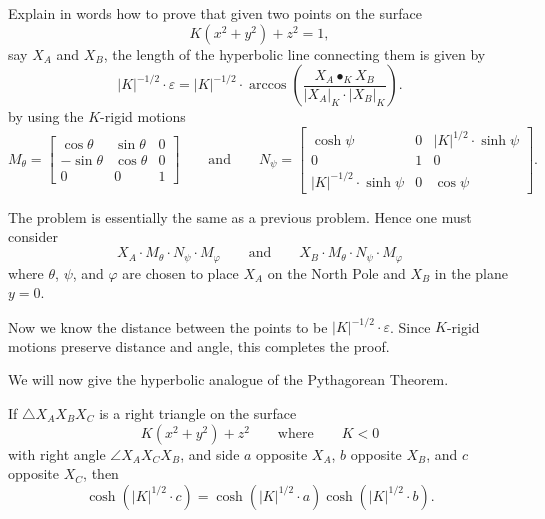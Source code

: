 \documentclass{ximera}
\begin{document}
\begin{problem}
  Explain in words how to prove that given two points on the surface
  \[
  K(x^2 + y^2) + z^2 =1,
  \]
  say $X_A$ and $X_B$, the length of the hyperbolic line connecting them
  is given by
  \[
  |K|^{-1/2}\cdot \varepsilon = |K|^{-1/2} \cdot \arccos\left(\frac{X_A\bullet_K X_B}{|X_A|_K\cdot |X_B|_K}\right).
  \]
  by using the $K$-rigid motions
  \[
   M_\theta=
  \begin{bmatrix}
    \cos\theta & \sin\theta & 0\\
    -\sin\theta & \cos\theta & 0\\
    0 & 0 & 1
  \end{bmatrix}
  \qquad\text{and}\qquad
 N_\psi=
  \begin{bmatrix}
    \cosh\psi & 0 & |K|^{1/2}\cdot\sinh\psi\\
    0 & 1 & 0\\
    |K|^{-1/2}\cdot\sinh\psi & 0 & \cos\psi
  \end{bmatrix}.
  \]
  \begin{freeResponse}
    The problem is essentially the same as a previous problem. Hence one must consider
    \[
    X_A\cdot M_\theta\cdot N_\psi\cdot M_\varphi \qquad\text{and}\qquad
    X_B\cdot M_\theta\cdot N_\psi\cdot M_\varphi
    \]
    where $\theta$, $\psi$, and $\varphi$ are chosen to place $X_A$ on
    the North Pole and $X_B$ in the plane $y=0$.

    Now we know the distance between the points to be
    $|K|^{-1/2}\cdot\varepsilon$. Since $K$-rigid motions preserve
    distance and angle, this completes the proof.
  \end{freeResponse}
\end{problem}


We will now give the hyperbolic analogue of the Pythagorean Theorem.

\begin{theorem}
  If $\triangle X_AX_BX_C$ is a right triangle on the surface
  \[
  K(x^2+y^2)+z^2\qquad\text{where}\qquad K<0
  \]
  with right angle $\angle X_AX_CX_B$, and side $a$ opposite $X_A$,
  $b$ opposite $X_B$, and $c$ opposite $X_C$, then
  \[
  \cosh\left(|K|^{1/2}\cdot c\right)=\cosh\left(|K|^{1/2}\cdot a\right)\cosh\left(|K|^{1/2}\cdot b\right).
  \]
\end{theorem}
\end{document}

